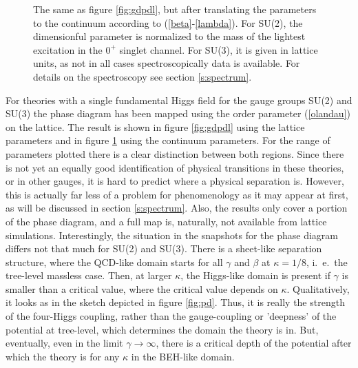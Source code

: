 \documentclass[final,twoside,12pt]{article}
\newcommand*{\pref}[1]{(\ref{#1})}
\newcommand*{\prefr}[2]{(\ref{#1}-\ref{#2})}
\newcommand*{\1}{1\!\!\!\bot}
\begin{document}
\begin{figure}[!htbp]
\begin{minipage}{0.7\linewidth}
\end{minipage}
\begin{minipage}{0.3\linewidth}
\caption{\label{fig:gdpdc}The same as figure \ref{fig:gdpdl}, but after translating the parameters to the continuum according to \prefr{beta}{lambda}. For SU(2), the dimensionful parameter is normalized  to the mass of the lightest excitation in the $0^+$ singlet channel. For SU(3), it is given in lattice units, as not in all cases spectroscopically data is available. For details on the spectroscopy see section \ref{s:spectrum}.}
\end{minipage}
\end{figure}

For theories with a single fundamental Higgs field for the gauge groups SU(2) \cite{Maas:2014pba} and SU(3) \cite{Maas:2016ngo} the phase diagram has been mapped using the order parameter \pref{olandau} on the lattice. The result is shown in figure \ref{fig:gdpdl} using the lattice parameters and in figure \ref{fig:gdpdc} using the continuum parameters. For the range of parameters plotted there is a clear distinction between both regions. Since there is not yet an equally good identification of physical transitions in these theories, or in other gauges, it is hard to predict where a physical separation is. However, this is actually far less of a problem for phenomenology as it may appear at first, as will be discussed in section \ref{s:spectrum}. Also, the results only cover a portion of the phase diagram, and a full map is, naturally, not available from lattice simulations. Interestingly, the situation in the snapshots for the phase diagram differs not that much for SU(2) and SU(3). There is a sheet-like separation structure, where the QCD-like domain starts for all $\gamma$ and $\beta$ at $\kappa=1/8$, i.\ e.\ the tree-level massless case. Then, at larger $\kappa$, the Higgs-like domain is present if $\gamma$ is smaller than a critical value, where the critical value depends on $\kappa$. Qualitatively, it looks as in the sketch depicted in figure \ref{fig:pd}. Thus, it is really the strength of the four-Higgs coupling, rather than the gauge-coupling or 'deepness' of the potential at tree-level, which determines the domain the theory is in. But, eventually, even in the limit $\gamma\to\infty$, there is a critical depth of the potential after which the theory is for any $\kappa$ in the BEH-like domain.
\end{document}
